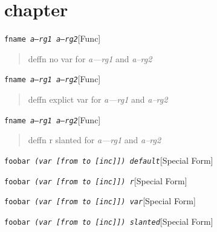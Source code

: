 \documentclass{book}
\newcommand\GNUTexinfocommandstyletextvar[1]{{\normalfont{}\textsl{#1}}}%
\begin{document}
\label{anchor:Top}%
\chapter{{chapter}}
\label{anchor:chapter}%

\noindent\texttt{fname \EmbracOn{}\textnormal{\textsl{a---rg1 a--rg2}}\EmbracOff{}}\hfill[Func]

%
\begin{quote}
\unskip{\parskip=0pt\noindent}%
deffn no var for \GNUTexinfocommandstyletextvar{a---rg1} and \GNUTexinfocommandstyletextvar{a--rg2}
\end{quote}

\noindent\texttt{fname \EmbracOn{}\textnormal{\textsl{\GNUTexinfocommandstyletextvar{a---rg1} \GNUTexinfocommandstyletextvar{a--rg2}}}\EmbracOff{}}\hfill[Func]

%
\begin{quote}
\unskip{\parskip=0pt\noindent}%
deffn explict var for \GNUTexinfocommandstyletextvar{a---rg1} and \GNUTexinfocommandstyletextvar{a--rg2}
\end{quote}

\noindent\texttt{fname \EmbracOn{}\textnormal{\textsl{\EmbracOff{}\textnormal{\textsl{a---rg1}}\EmbracOn{} \EmbracOff{}\textnormal{\textsl{a--rg2}}\EmbracOn{}}}\EmbracOff{}}\hfill[Func]

%
\begin{quote}
\unskip{\parskip=0pt\noindent}%
deffn r slanted for \GNUTexinfocommandstyletextvar{a---rg1} and \GNUTexinfocommandstyletextvar{a--rg2}
\end{quote}

\noindent\texttt{foobar \EmbracOn{}\textnormal{\textsl{(var [from to [inc]]) default}}\EmbracOff{}}\hfill[Special Form]

%
\noindent\texttt{foobar \EmbracOn{}\textnormal{\textsl{(var \EmbracOff{}\textnormal{[}\EmbracOn{}from to \EmbracOff{}\textnormal{[}\EmbracOn{}inc\EmbracOff{}\textnormal{]]}\EmbracOn{}) r}}\EmbracOff{}}\hfill[Special Form]

%
\noindent\texttt{foobar \EmbracOn{}\textnormal{\textsl{(var \GNUTexinfocommandstyletextvar{[}from to \GNUTexinfocommandstyletextvar{[}inc\GNUTexinfocommandstyletextvar{]]}) var}}\EmbracOff{}}\hfill[Special Form]

%
\noindent\texttt{foobar \EmbracOn{}\textnormal{\textsl{(var \textsl{[}from to \textsl{[}inc\textsl{]]}) slanted}}\EmbracOff{}}\hfill[Special Form]
\end{document}

